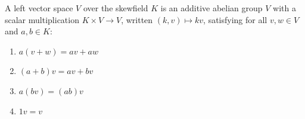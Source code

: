 A left vector space $V$ over the skewfield $K$ is an additive abelian group $V$ with a scalar multiplication $K \times V \to V$, written $(k, v) \mapsto kv$, satisfying for all $v, w \in V$ and $a, b \in K$:
\begin{enumerate}
\item $a(v+w) = av + aw$
\item $(a+b)v = av + bv$
\item $a(bv) = (ab)v$
\item $1v = v$
\end{enumerate}
